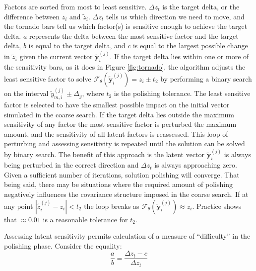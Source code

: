 Factors are sorted from most to least sensitive. $\Delta z_{t}$ is the target delta, or the difference between $z_{i}$ and $\tilde{z}_{i}$. $\Delta z_{t}$ tells us which direction we need to move, and the tornado bars tell us which factor(s) is sensitive enough to achieve the target delta. $a$ represents the delta between the most sensitive factor and the target delta, $b$ is equal to the target delta, and $c$ is equal to the largest possible change in $\tilde{z}_{i}$ given the current vector $\tilde{\mathbf{y}}_{i}^{(j)}$. If the target delta lies within one or more of the sensitivity bars, as it does in Figure \ref{fig:tornado}, the algorithm adjusts the least sensitive factor to solve $\mathcal{F}_{\theta}(\tilde{\mathbf{y}}_{i}^{(j)}) = z_{i} \pm t_{2}$ by performing a binary search \citep{nowak2008generalized} on the interval $\tilde{y}_{m, i}^{(j)} \pm \Delta_{y}$, where $t_{2}$ is the polishing tolerance. The least sensitive factor is selected to have the smallest possible impact on the initial vector simulated in the coarse search. If the target delta lies outside the maximum sensitivity of any factor the most sensitive factor is perturbed the maximum amount, and the sensitivity of all latent factors is reassessed. This loop of perturbing and assessing sensitivity is repeated until the solution can be solved by binary search. The benefit of this approach is the latent vector $\tilde{\mathbf{y}}_{i}^{(j)}$ is always being perturbed in the correct direction and $\Delta z_{t}$ is always approaching zero. Given a sufficient number of iterations, solution polishing will converge. That being said, there may be situations where the required amount of polishing negatively influences the covariance structure imposed in the coarse search. If at any point $|\tilde{z}_{i}^{(j)} - z_{i}| < t_{2}$ the loop breaks as $\mathcal{F}_{\theta}(\tilde{\mathbf{y}}_{i}^{(j)}) \approx z_{i}$. Practice shows that $\approx 0.01$ is a reasonable tolerance for $t_2$.

Assessing latent sensitivity permits calculation of a measure of ``difficulty'' in the polishing phase. Consider the equality:
\begin{equation}
    \frac{a}{b} = \frac{\Delta z_{t} - c}{\Delta z_{t}}
    \label{eq:aoverb}
\end{equation}

